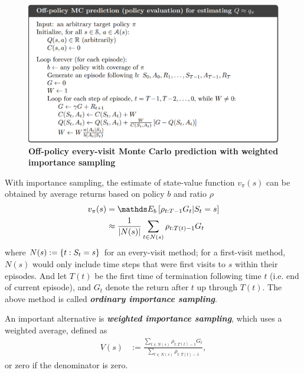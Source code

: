 \documentclass[11pt]{article}
\begin{document}
\begin{figure}
\begin{minipage}[t]{1\linewidth}
  \centering
  \centerline{\includegraphics[scale = 0.3]{off_policy_mc_prediction.png}}
\end{minipage}
\caption{\footnotesize{\textbf{Off-policy every-visit Monte Carlo prediction with weighted importance sampling}}}
\label{fig: off_policy_mc_prediction}
\end{figure}

With importance sampling, the estimate of state-value function $v_{\pi}(s)$ can be obtained by average returns based on policy $b$ and ratio $\rho$
\begin{align}
v_{\pi}(s)&= \E{b}{\rho_{t:T-1}G_{t} | S_{t}=s}  \nonumber\\
&\approx \frac{1}{|N(s)|}\sum_{t \in N(s)}\rho_{t:T(t)-1}G_{t} \label{eqn: MC_IS}
\end{align} where $N(s) := \left\{t: S_{t} = s\right\}$ for an every-visit method; for a first-visit method, $N(s)$ would only include time steps that were first visits to $s$ within their episodes. And let $T(t)$ be the first time of termination following time $t$ (i.e. end of current episode), and $G_t$ denote the return after $t$ up through $T(t)$. The above method is called \emph{\textbf{ordinary importance sampling}}.

An important alternative is \emph{\textbf{weighted importance sampling}}, which uses a weighted average, defined as
\begin{align}
V(s) &:= \frac{\sum_{t \in N(s)}\rho_{t:T(t)-1}G_{t}}{\sum_{t \in N(s)}\rho_{t:T(t)-1}}, \label{eqn: MC_weighted_IS}
\end{align} or zero if the denominator is zero. 
\end{document}
